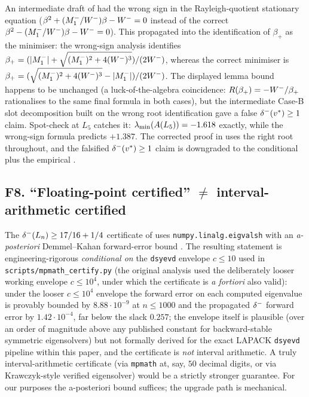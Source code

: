 An intermediate draft of  had the wrong sign in the
Rayleigh-quotient stationary equation
($\beta^{2} + (M_{1}^{-}/W^{-})\beta - W^{-} = 0$ instead of the correct
$\beta^{2} - (M_{1}^{-}/W^{-})\beta - W^{-} = 0$). This propagated into the
identification of $\beta_{+}$ as the minimiser: the wrong-sign analysis
identifies $\beta_{+} = (|M_{1}^{-}| + \sqrt{(M_{1}^{-})^{2} + 4(W^{-})^{3}})/(2W^{-})$,
whereas the correct minimiser is
$\beta_{+} = (\sqrt{(M_{1}^{-})^{2} + 4(W^{-})^{3}} - |M_{1}^{-}|)/(2W^{-})$.
The displayed lemma bound happens to be unchanged (a luck-of-the-algebra
coincidence: $R(\beta_{+}) = -W^{-}/\beta_{+}$ rationalises to the same
final formula in both cases), but the intermediate Case-B slot
decomposition built on the wrong root identification gave a false
$\delta^{-}(v^{*}) \ge 1$ claim. Spot-check at $L_{5}$ catches it:
$\lambda_{\min}(A(L_{5})) = -1.618$ exactly, while the wrong-sign
formula predicts $+1.387$. The corrected proof in
 uses the right root throughout, and
the falsified $\delta^{-}(v^{*}) \ge 1$ claim is downgraded to the
conditional  plus the empirical
.

\subsection{F8. ``Floating-point certified'' $\neq$ interval-arithmetic certified}
\label{sec:fm:fp-vs-interval}

The $\delta^{-}(L_{n}) \ge 17/16 + 1/4$ certificate of 
uses \texttt{numpy.linalg.eigvalsh} with an \emph{a-posteriori}
Demmel--Kahan forward-error bound \cite[Thm.~5.5]{DemmelANLA}. The
resulting statement is engineering-rigorous \emph{conditional on} the
\texttt{dsyevd} envelope $c \le 10$ used in
\texttt{scripts/mpmath\_certify.py} (the original analysis used the
deliberately looser working envelope $c \le 10^{4}$, under which the
certificate is \emph{a fortiori} also valid): under the looser
$c \le 10^{4}$ envelope the forward error on each computed eigenvalue
is provably bounded by $8.88 \cdot 10^{-9}$ at $n \le 1000$ and the
propagated $\delta^{-}$ forward error by $1.42 \cdot 10^{-4}$, far below
the slack $0.257$; the envelope itself is plausible (over an order
of magnitude above any published constant for backward-stable
symmetric eigensolvers) but not formally derived for the exact LAPACK
\texttt{dsyevd} pipeline within this paper, and the certificate is
\emph{not} interval arithmetic. A truly interval-arithmetic certificate (via
\texttt{mpmath} at, say, $50$ decimal digits, or via Krawczyk-style
verified eigensolver) would be a strictly stronger guarantee. For our
purposes the a-posteriori bound suffices; the upgrade path is
mechanical.

